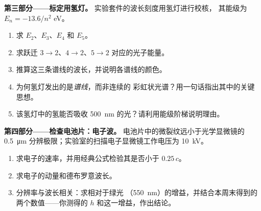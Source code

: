 \begin{problem}
\medskip
\noindent\textbf{第三部分——标定用氢灯。}
实验套件的波长刻度用氢灯进行校核，
其能级为 $E_n = -13.6/n^2$ \unit{eV}。
\begin{enumerate}[resume]
  \item 求 $E_2$、$E_3$、$E_4$ 和 $E_5$。
  \item 求跃迁 $3 \to 2$、$4 \to 2$、$5 \to 2$ 对应的光子能量。
  \item 推算这三条谱线的波长，并说明各谱线的颜色。
  \item 为何氢灯发出的是\emph{谱线}，而非连续的
        彩虹状光谱？用一句话指出其中的关键思想。
  \item 该氢灯中的氢能否吸收 \qty{500}{nm} 的光？请利用能级阶梯说明理由。
\end{enumerate}

\medskip
\noindent\textbf{第四部分——检查电池片：电子波。}
电池片中的微裂纹远小于光学显微镜的
\qty{0.5}{\micro m} 分辨极限；实验室的扫描电子显微镜工作电压为 \qty{10}{kV}。
\begin{enumerate}[resume]
  \item 求电子的速率，并用经典公式检验其是否小于 $0.25\,c$。
  \item 求电子的动量和德布罗意波长。
  \item 分辨率与波长相关：求相对于绿光
        （\qty{550}{nm}）的增益，并结合本周末得到的两个数值——你测得的 $h$
        和这一增益，作出结论。
\end{enumerate}
\end{problem}
